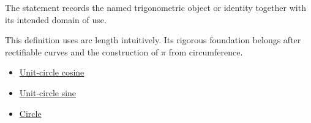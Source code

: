 \begin{remark*}[Interpretation]
The statement records the named trigonometric object or identity together with
its intended domain of use.
\end{remark*}

\begin{remark*}
This definition uses arc length intuitively. Its rigorous foundation belongs
after rectifiable curves and the construction of $\pi$ from circumference.
\end{remark*}
\begin{dependencies}
\begin{itemize}
  \item \hyperref[def:unit-circle-cosine]{Unit-circle cosine}
  \item \hyperref[def:unit-circle-sine]{Unit-circle sine}
  \item \hyperref[def:euclid-circle]{Circle}
\end{itemize}
\end{dependencies}
